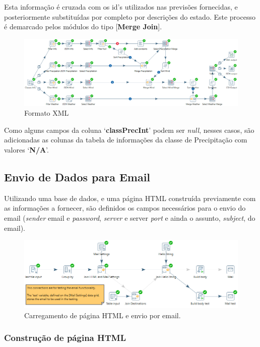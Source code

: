 Esta informação é cruzada com os id's utilizados nas previsões fornecidas, e posteriormente substituídas por completo por descrições do estado. Este processo é demarcado pelos módulos do tipo [\textbf{Merge Join}].

\begin{figure}[H]
    \centering
    \includegraphics[scale=0.4]{imagens-spoon/previsao-spoon.png}
    \caption{Formato XML}
\end{figure}

Como alguns campos da coluna `\textbf{classPrecInt}' podem ser \textit{null}, nesses casos, são adicionadas as colunas da tabela de informações da classe de Precipitação com valores `\textbf{N/A}'.

\newpage

\subsection*{Envio de Dados para Email}

Utilizando uma base de dados, e uma página HTML construída previamente com as informações a fornecer, são definidos os campos necessários para o envio do email (\textit{sender} email e \textit{password}, \textit{server} e server \textit{port} e ainda o assunto, \textit{subject}, do email).

\begin{figure}[H]
    \centering
    \includegraphics[scale=0.5]{imagens-spoon/email.png}
    \caption{Carregamento de página HTML e envio por email.}
    \label{fig:my_label}
\end{figure}

\subsubsection{Construção de página HTML}

